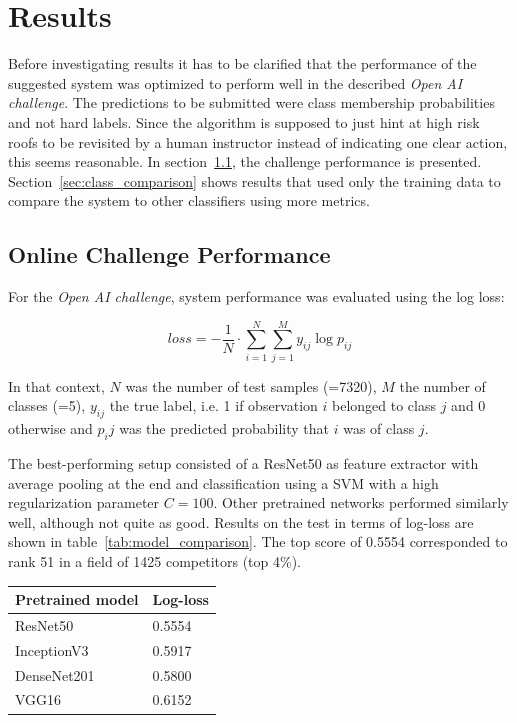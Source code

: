 \documentclass[11pt]{article}
\begin{document}
	\section{Results}
	
	Before investigating results it has to be clarified that the performance of the suggested system was optimized to perform well in the described \textit{Open AI challenge}. The predictions to be submitted were class membership probabilities and not hard labels. Since the algorithm is supposed to just hint at high risk roofs to be revisited by a human instructor instead of indicating one clear action, this seems reasonable. In section~\ref{sec:challenge_perf}, the challenge performance is presented. Section~\ref{sec:class_comparison} shows results that used only the training data to compare the system to other classifiers using more metrics.
	
	\subsection{Online Challenge Performance}
	\label{sec:challenge_perf}
	
	For the \textit{Open AI challenge}, system performance was evaluated using the log loss:
	
	\begin{equation}
		loss = -\frac{1}{N}\cdot \sum_{i=1}^{N} \sum_{j=1}^{M}y_{ij}\log p_{ij}
	\end{equation}
	
	In that context, $N$ was the number of test samples (=7320), $M$ the number of classes (=5), $y_{ij}$ the true label, i.e. 1 if observation $i$ belonged to class $j$ and 0 otherwise and $p_ij$ was the predicted probability that $i$ was of class $j$. 
	
	The best-performing setup consisted of a ResNet50 as feature extractor with average pooling at the end and classification using a SVM with a high regularization parameter $C=100$.
	Other pretrained networks performed similarly well, although not quite as good. Results on the test in terms of log-loss are shown in table~\ref{tab:model_comparison}.
	The top score of 0.5554 corresponded to rank 51 in a field of 1425 competitors (top 4\%).
	
	\begin{center}
		\bgroup
		\def\arraystretch{1.1}
		\begin{tabular}{ | m{4cm} | m{2cm} | } 
			
			\hline
			Pretrained model & Log-loss \\
			\hline
			\hline
			ResNet50 & 0.5554 \\
			\hline
			InceptionV3 & 0.5917\\
			\hline
			DenseNet201 & 0.5800\\
			\hline
			VGG16 & 0.6152\\
			\hline
		\end{tabular}
		\egroup
		\label{tab:model_comparison}
	\end{center}
\end{document}
